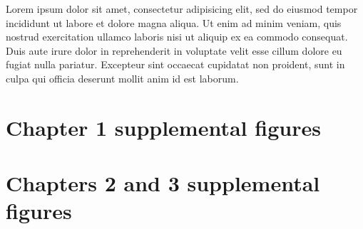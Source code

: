 Lorem ipsum dolor sit amet, consectetur adipisicing elit, sed do eiusmod tempor incididunt ut labore et dolore magna aliqua. Ut enim ad minim veniam, quis nostrud exercitation ullamco laboris nisi ut aliquip ex ea commodo consequat. Duis aute irure dolor in reprehenderit in voluptate velit esse cillum dolore eu fugiat nulla pariatur. Excepteur sint occaecat cupidatat non proident, sunt in culpa qui officia deserunt mollit anim id est laborum.


% 
\appendix
\raggedbottom\sloppy

\chapter{Chapter 1 supplemental figures}



\chapter{Chapters 2 and 3 supplemental figures}
\begin{centering}
  \begin{table}[h]
    \caption{\textbf{Fit parameter values for fitness model}}
  \label{parameter_values}
\end{table}
\end{centering}


